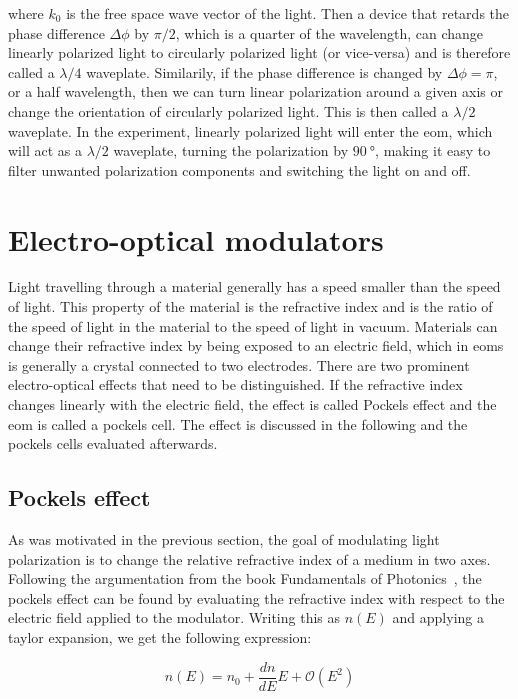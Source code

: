 where $k_0$ is the free space wave vector of the light. Then a device that retards the phase difference $\Delta \phi$ by $\pi/2$, which is a quarter of the wavelength, can change linearly polarized light to circularly polarized light (or vice-versa) and is therefore called a $\lambda / 4$ waveplate. Similarily, if the phase difference is changed by $\Delta \phi = \pi$, or a half wavelength, then we can turn linear polarization around a given axis or change the orientation of circularly polarized light. This is then called a $\lambda / 2$ waveplate. In the experiment, linearly polarized light will enter the \ac{eom}, which will act as a $\lambda / 2$ waveplate, turning the polarization by $\SI{90}{\degree}$, making it easy to filter unwanted polarization components and switching the light on and off.

\section{Electro-optical modulators}%
\label{sec:eom}

Light travelling through a material generally has a speed smaller than the speed of light. This property of the material is the refractive index and is the ratio of the speed of light in the material to the speed of light in vacuum. Materials can change their refractive index by being exposed to an electric field, which in \acp{eom} is generally a crystal connected to two electrodes. There are two prominent electro-optical effects that need to be distinguished. If the refractive index changes linearly with the electric field, the effect is called Pockels effect and the \ac{eom} is called a pockels cell. The effect is discussed in the following and the pockels cells evaluated afterwards.

\subsection{Pockels effect}%
\label{sec:pockels_effect}

As was motivated in the previous section, the goal of modulating light polarization is to change the relative refractive index of a medium in two axes. Following the argumentation from the book Fundamentals of Photonics~\cite{Saleh1991}, the pockels effect can be found by evaluating the refractive index with respect to the electric field applied to the modulator. Writing this as $n(E)$ and applying a taylor expansion, we get the following expression:

\begin{equation}
	n(E) = n_0 + \frac{dn}{dE} E + \mathcal{O}(E^2)
\end{equation}

